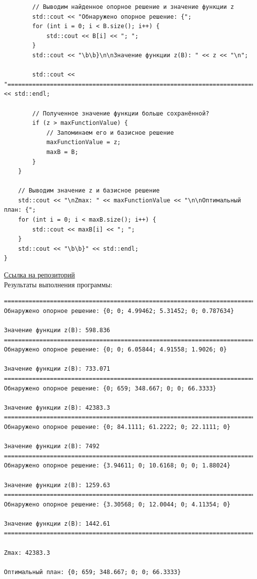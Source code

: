 \documentclass[a4paper,14pt]{extarticle}
\begin{document}
\begin{verbatim}
        // Выводим найденное опорное решение и значение функции z 
        std::cout << "Обнаружено опорное решение: {";
        for (int i = 0; i < B.size(); i++) {
            std::cout << B[i] << "; ";
        }
        std::cout << "\b\b}\n\nЗначение функции z(B): " << z << "\n";

        std::cout << "==================================================================================================================" << std::endl;

        // Полученное значение функции больше сохранённой?
        if (z > maxFunctionValue) {
            // Запоминаем его и базисное решение
            maxFunctionValue = z;
            maxB = B;
        }
    }

    // Выводим значение z и базисное решение
    std::cout << "\nZmax: " << maxFunctionValue << "\n\nОптимальный план: {";
    for (int i = 0; i < maxB.size(); i++) {
        std::cout << maxB[i] << "; ";
    }
    std::cout << "\b\b}" << std::endl;
}
    \end{verbatim}
\href{https://github.com/IAmProgrammist/operations_research/blob/master/src/lab1/task2/main.cpp}{Ссылка на репозиторий}\\

Результаты выполнения программы:
\begin{verbatim}
==================================================================================================================
Обнаружено опорное решение: {0; 0; 4.99462; 5.31452; 0; 0.787634}

Значение функции z(B): 598.836
==================================================================================================================
Обнаружено опорное решение: {0; 0; 6.05844; 4.91558; 1.9026; 0}

Значение функции z(B): 733.071
==================================================================================================================
Обнаружено опорное решение: {0; 659; 348.667; 0; 0; 66.3333}

Значение функции z(B): 42383.3
==================================================================================================================
Обнаружено опорное решение: {0; 84.1111; 61.2222; 0; 22.1111; 0}

Значение функции z(B): 7492
==================================================================================================================
Обнаружено опорное решение: {3.94611; 0; 10.6168; 0; 0; 1.88024}

Значение функции z(B): 1259.63
==================================================================================================================
Обнаружено опорное решение: {3.30568; 0; 12.0044; 0; 4.11354; 0}

Значение функции z(B): 1442.61
==================================================================================================================

Zmax: 42383.3

Оптимальный план: {0; 659; 348.667; 0; 0; 66.3333}
\end{verbatim}
\end{document}
